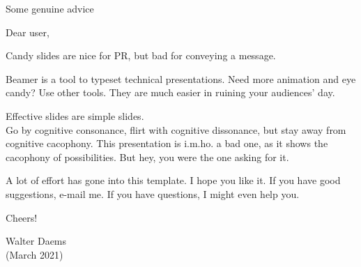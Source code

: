 \documentclass[aspectratio=1610]{beamer}
\begin{document}
\begin{frame}
  {Some genuine advice}
  \small

  Dear user,

  Candy slides are nice for PR, but bad for conveying a message.

  Beamer is a tool to typeset technical presentations. Need more
  animation and eye candy? Use other tools. They are much easier in
  ruining your audiences' day.

  Effective slides are simple slides.\\
  Go by cognitive consonance, flirt with cognitive dissonance, but
  stay away from cognitive cacophony.
  This presentation is i.m.ho. a bad one, as it shows the
  cacophony of possibilities. But hey, you were the one asking for it.

  A lot of effort has gone into this template. I hope you like it.
  If you have good suggestions, e-mail me. If you have questions, I
  might even help you.

  Cheers!

  Walter Daems\\
  (March 2021)

\end{frame}
\end{document}

